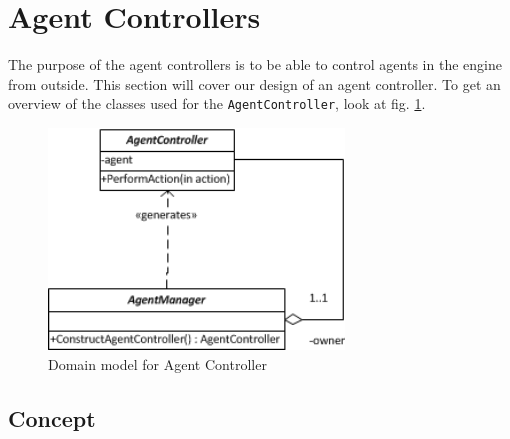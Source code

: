 
\section{Agent Controllers}

The purpose of the agent controllers is to be able to control agents
in the engine from outside. This section will cover our design of
an agent controller. To get an overview of the classes used for the
\texttt{AgentController}, look at fig. \ref{fig:AgentControllerDomainModel}.

\begin{figure}
\begin{centering}
\includegraphics[width=0.7\textwidth]{AgentControllerDomainUML}
\par\end{centering}

\caption{Domain model for Agent Controller\label{fig:AgentControllerDomainModel}}
\end{figure}



\subsection{Concept}

